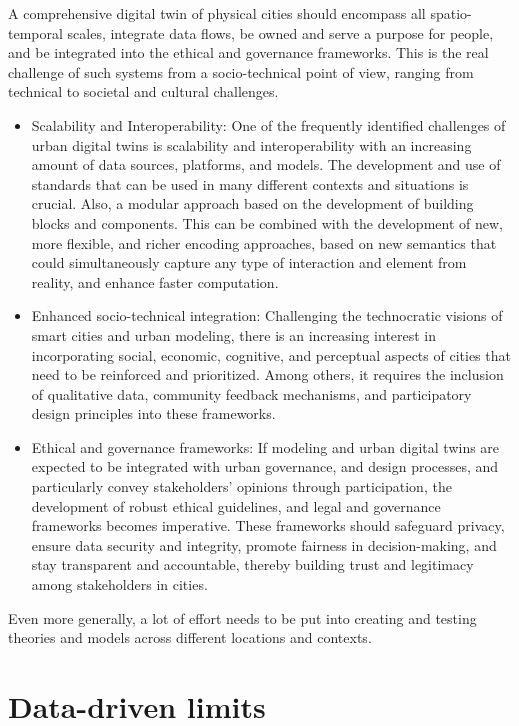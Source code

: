 A comprehensive digital twin of physical cities should encompass all spatio-temporal scales, integrate data flows, be owned and serve a purpose for people, and be integrated into the ethical and governance frameworks. This is the real challenge of such systems from a socio-technical point of view, ranging from technical to societal and cultural challenges.

\begin{itemize}
    \item Scalability and Interoperability: One of the frequently identified challenges of urban digital twins is scalability and interoperability with an increasing amount of data sources, platforms, and models. The development and use of standards that can be used in many different contexts and situations is crucial. Also, a modular approach based on the development of building blocks and components. This can be combined with the development of new, more flexible, and richer encoding approaches, based on new semantics that could simultaneously capture any type of interaction and element from reality, and enhance faster computation.
    \item Enhanced socio-technical integration: Challenging the technocratic visions of smart cities and urban modeling, there is an increasing interest in incorporating social, economic, cognitive, and perceptual aspects of cities that need to be reinforced and prioritized. Among others, it requires the inclusion of qualitative data, community feedback mechanisms, and participatory design principles into these frameworks.
    \item Ethical and governance frameworks: If modeling and urban digital twins are expected to be integrated with urban governance, and design processes, and particularly convey stakeholders' opinions through participation, the development of robust ethical guidelines, and legal and governance frameworks becomes imperative. These frameworks should safeguard privacy, ensure data security and integrity, promote fairness in decision-making, and stay transparent and accountable, thereby building trust and legitimacy among stakeholders in cities.
    
\end{itemize}
Even more generally, a lot of effort needs to be put into creating and testing theories and models across different locations and contexts. 

\section{Data-driven limits}

